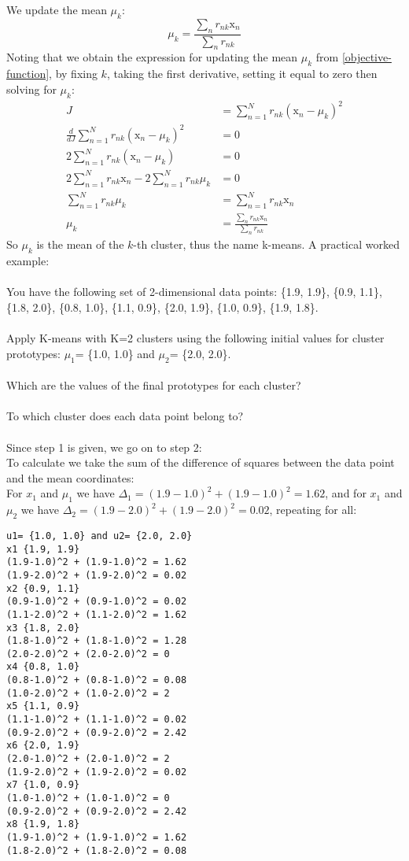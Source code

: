 We update the mean $\mu_k$:
$$
\mu_k = \frac{\sum_n r_{nk}\mathrm{x}_n}{\sum_n r_{nk}}
$$
Noting that we obtain the expression for updating the mean $\mu_k$ from \ref{objective-function}, by fixing $k$, taking the first derivative, setting it equal to zero then solving for $\mu_k$:
\begin{align*}
    J & = \sum_{n=1}^N r_{nk} (\mathrm{x}_n-\mu_k)^2 \\
    \frac{d}{dJ}\sum_{n=1}^N r_{nk} (\mathrm{x}_n-\mu_k)^2 & = 0 \\
    2 \sum_{n=1}^N r_{nk} (\mathrm{x}_n-\mu_k) & = 0 \\
    2\sum_{n=1}^N r_{nk}\mathrm{x}_n - 2\sum_{n=1}^N r_{nk}\mu_k & = 0 \\
    \sum_{n=1}^N r_{nk}\mu_k & = \sum_{n=1}^N r_{nk}\mathrm{x}_n \\
    \mu_k & = \frac{\sum_n r_{nk}\mathrm{x}_n}{\sum_n r_{nk}}    
\end{align*}
So $\mu_k$ is the mean of the $k$-th cluster, thus the name k-means. A practical worked example: \\
\\
You have the following set of 2-dimensional data points: \{1.9, 1.9\}, \{0.9, 1.1\}, \{1.8, 2.0\}, \{0.8, 1.0\}, \{1.1, 0.9\}, \{2.0, 1.9\}, \{1.0, 0.9\}, \{1.9, 1.8\}. \\
\\
Apply K-means with K=2 clusters using the following initial values for cluster prototypes: $\mu_1$= \{1.0, 1.0\} and $\mu_2$= \{2.0, 2.0\}. \\
\\
Which are the values of the final prototypes for each cluster? \\
\\
To which cluster does each data point belong to? \\
\\
Since step 1 is given, we go on to step 2: \\
To calculate we take the sum of the difference of squares between the data point and the mean coordinates: \\
For $x_1$ and $\mu_1$ we have $\Delta_1 = (1.9-1.0)^2+(1.9-1.0)^2 = 1.62$, and for $x_1$ and $\mu_2$ we have $\Delta_2 = (1.9-2.0)^2+(1.9-2.0)^2 = 0.02$, repeating for all:
\begin{verbatim}
u1= {1.0, 1.0} and u2= {2.0, 2.0}
x1 {1.9, 1.9}
(1.9-1.0)^2 + (1.9-1.0)^2 = 1.62
(1.9-2.0)^2 + (1.9-2.0)^2 = 0.02
x2 {0.9, 1.1}
(0.9-1.0)^2 + (0.9-1.0)^2 = 0.02
(1.1-2.0)^2 + (1.1-2.0)^2 = 1.62
x3 {1.8, 2.0}
(1.8-1.0)^2 + (1.8-1.0)^2 = 1.28
(2.0-2.0)^2 + (2.0-2.0)^2 = 0
x4 {0.8, 1.0}
(0.8-1.0)^2 + (0.8-1.0)^2 = 0.08
(1.0-2.0)^2 + (1.0-2.0)^2 = 2
x5 {1.1, 0.9}
(1.1-1.0)^2 + (1.1-1.0)^2 = 0.02
(0.9-2.0)^2 + (0.9-2.0)^2 = 2.42
x6 {2.0, 1.9}
(2.0-1.0)^2 + (2.0-1.0)^2 = 2
(1.9-2.0)^2 + (1.9-2.0)^2 = 0.02
x7 {1.0, 0.9}
(1.0-1.0)^2 + (1.0-1.0)^2 = 0
(0.9-2.0)^2 + (0.9-2.0)^2 = 2.42
x8 {1.9, 1.8}
(1.9-1.0)^2 + (1.9-1.0)^2 = 1.62
(1.8-2.0)^2 + (1.8-2.0)^2 = 0.08    
\end{verbatim}
